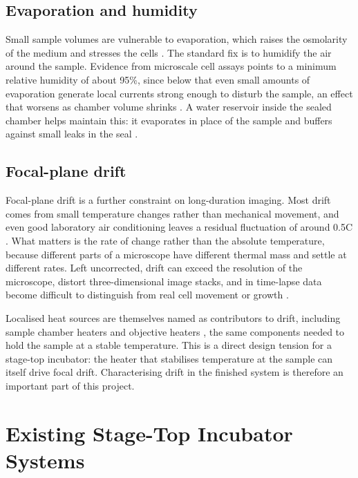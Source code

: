 \subsection{Evaporation and humidity}
\label{subsec:evaporation-humidity}

Small sample volumes are vulnerable to evaporation, which raises the osmolarity of the medium and stresses the cells \citep{frigault_live-cell_2009}. The standard fix is to humidify the air around the sample. Evidence from microscale cell assays points to a minimum relative humidity of about 95\%, since below that even small amounts of evaporation generate local currents strong enough to disturb the sample, an effect that worsens as chamber volume shrinks \citep{berthier_managing_2008,berthier_managing_2008-1}. A water reservoir inside the sealed chamber helps maintain this: it evaporates in place of the sample and buffers against small leaks in the seal \citep{berthier_managing_2008-1}.

\subsection{Focal-plane drift}
\label{subsec:drift-demands}

Focal-plane drift is a further constraint on long-duration imaging. Most drift comes from small temperature changes rather than mechanical movement, and even good laboratory air conditioning leaves a residual fluctuation of around 0.5\textdegree{}C \citep{adler_reducing_2003}. What matters is the rate of change rather than the absolute temperature, because different parts of a microscope have different thermal mass and settle at different rates. Left uncorrected, drift can exceed the resolution of the microscope, distort three-dimensional image stacks, and in time-lapse data become difficult to distinguish from real cell movement or growth \citep{adler_reducing_2003}.

Localised heat sources are themselves named as contributors to drift, including sample chamber heaters and objective heaters \citep{adler_reducing_2003}, the same components needed to hold the sample at a stable temperature. This is a direct design tension for a stage-top incubator: the heater that stabilises temperature at the sample can itself drive focal drift. Characterising drift in the finished system is therefore an important part of this project.

\section{Existing Stage-Top Incubator Systems}
\label{sec:existing-systems}

